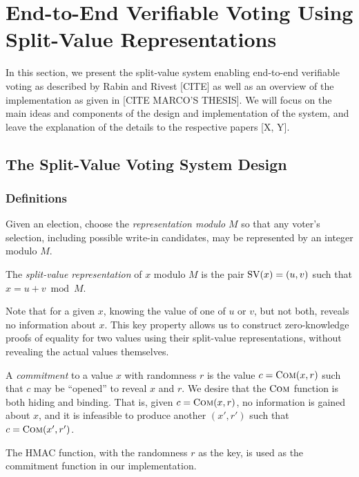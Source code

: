 \chapter{End-to-End Verifiable Voting Using Split-Value Representations}

In this section, we present the split-value system enabling end-to-end verifiable voting as described by Rabin and Rivest [CITE] as well as an overview of the implementation as given in [CITE MARCO'S THESIS]. We will focus on the main ideas and components of the design and implementation of the system, and leave the explanation of the details to the respective papers [X, Y].

\section{The Split-Value Voting System Design}

\subsection{Definitions}

Given an election, choose the \emph{representation modulo} $M$ so that any voter's selection, including possible write-in candidates, may be represented by an integer modulo $M$.

\begin{definition}
The \emph{split-value representation} of $x$ modulo $M$ is the pair $\text{SV}(x)=(u,v)$ such that $x = u+v \bmod M$.
\end{definition}

Note that for a given $x$, knowing the value of one of $u$ or $v$, but not both, reveals no information about $x$. This key property allows us to construct zero-knowledge proofs of equality for two values using their split-value representations, without revealing the actual values themselves.

\begin{definition}
A \emph{commitment} to a value $x$ with randomness $r$ is the value $c = \text{C}\textsc{om}(x, r)$ such that $c$ may be ``opened'' to reveal $x$ and $r$. We desire that the $\text{C}\textsc{om}$ function is both hiding and binding. That is, given $c = \text{C}\textsc{om}(x, r)$, no information is gained about $x$, and it is infeasible to produce another $(x', r')$ such that $c = \text{C}\textsc{om}(x', r')$.
\end{definition}

The HMAC function, with the randomness $r$ as the key, is used as the commitment function in our implementation.

